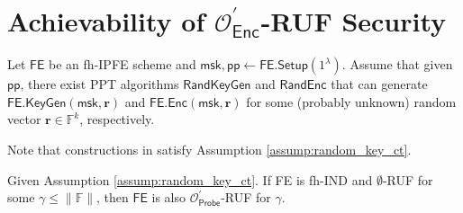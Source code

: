 \section{Achievability of $\mathcal{O}^\prime_{\textsf{Enc}}$-RUF Security}

\begin{assumption}
\label{assump:random_key_ct}

Let $\textsf{FE}$ be an fh-IPFE scheme and $\textsf{msk}, \textsf{pp} \gets \textsf{FE.Setup}(1^\lambda)$. Assume that given $\textsf{pp}$, there exist PPT algorithms $\textsf{RandKeyGen}$ and $\textsf{RandEnc}$ that can generate $\textsf{FE.KeyGen}(\textsf{msk}, \mathbf{r})$ and $\textsf{FE.Enc}(\textsf{msk}, \mathbf{r})$ for some (probably unknown) random vector $\mathbf{r} \in \mathbb{F}^k$, respectively.

\end{assumption}

Note that constructions in \cite{10.1007/978-3-319-45871-7_24, cryptoeprint:2016/440} satisfy Assumption \ref{assump:random_key_ct}.

\begin{theorem}
\label{thm:fh-IPFE:ind-OEnc-ruf}
Given Assumption \ref{assump:random_key_ct}. If \textsf{FE} is fh-IND and $\emptyset$-RUF for some $\gamma \leq \|\mathbb{F}\|$, then $\textsf{FE}$ is also $\mathcal{O}^\prime_{\textsf{Probe}}$-RUF for $\gamma$.

\end{theorem}

